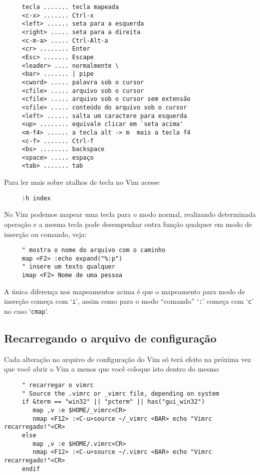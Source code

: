 \begin{verbatim}
     tecla ....... tecla mapeada
     <c-x> ....... Ctrl-x
     <left> ...... seta para a esquerda
     <right> ..... seta para a direita
     <c-m-a> ..... Ctrl-Alt-a
     <cr> ........ Enter
     <Esc> ....... Escape
     <leader> .... normalmente \
     <bar> ....... | pipe
     <cword> ..... palavra sob o cursor
     <cfile> ..... arquivo sob o cursor
     <cfile> ..... arquivo sob o cursor sem extensão
     <sfile> ..... conteúdo do arquivo sob o cursor
     <left> ...... salta um caractere para esquerda
     <up> ........ equivale clicar em `seta acima'
     <m-f4> ...... a tecla alt -> m  mais a tecla f4
     <c-f> ....... Ctrl-f
     <bs> ........ backspace
     <space> ..... espaço
     <tab> ....... tab
\end{verbatim}

Para ler mais sobre atalhos de tecla no Vim acesse 

\begin{verbatim}
     :h index
\end{verbatim}

No Vim podemos mapear uma tecla para o modo normal, realizando
determinada operação e a mesma tecla pode desempenhar outra função
qualquer em modo de inserção ou comando, veja:

\begin{verbatim}
     " mostra o nome do arquivo com o caminho
     map <F2> :echo expand("%:p")
     " insere um texto qualquer
     imap <F2> Nome de uma pessoa
\end{verbatim}

A única diferença nos mapeamentos acima é que o mapeamento para modo de
inserção começa com `{\tt i}', assim como para o modo ``comando'' `{\tt :}'
começa com `{\tt c}' no caso `{\tt cmap}'.

\subsection{Recarregando o arquivo de configuração}
\label{sec:Recarregando o arquivo de configuração}

Cada alteração no arquivo de configuração do Vim só terá efeito na próxima vez que você
abrir o Vim a menos que você coloque isto dentro do mesmo

\begin{verbatim}
     " recarregar o vimrc
     " Source the .vimrc or _vimrc file, depending on system
     if &term == "win32" || "pcterm" || has("gui_win32")
        map ,v :e $HOME/_vimrc<CR>
        nmap <F12> :<C-u>source ~/_vimrc <BAR> echo "Vimrc recarregado!"<CR>
     else
        map ,v :e $HOME/.vimrc<CR>
        nmap <F12> :<C-u>source ~/.vimrc <BAR> echo "Vimrc recarregado!"<CR>
     endif
\end{verbatim}

